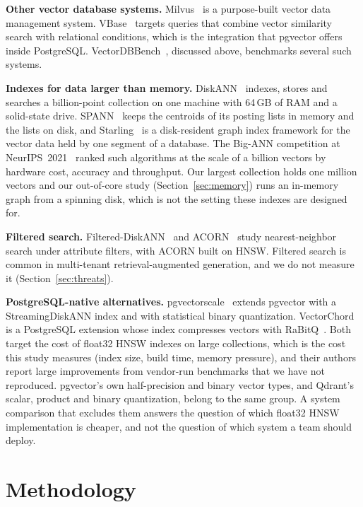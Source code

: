 \documentclass[preprint,12pt]{elsarticle}
\begin{document}
\textbf{Other vector database systems.} Milvus~\cite{milvus2021} is a purpose-built vector
data management system. VBase~\cite{vbase2023} targets queries that combine vector similarity
search with relational conditions, which is the integration that pgvector offers inside
PostgreSQL. VectorDBBench~\cite{vectordbbench}, discussed above, benchmarks several such
systems.

\textbf{Indexes for data larger than memory.} DiskANN~\cite{diskann2019} indexes, stores and
searches a billion-point collection on one machine with 64\,GB of RAM and a solid-state
drive. SPANN~\cite{spann2021} keeps the centroids of its posting lists in memory and the lists
on disk, and Starling~\cite{starling2024} is a disk-resident graph index framework for the
vector data held by one segment of a database. The Big-ANN competition at
NeurIPS~2021~\cite{bigann2022} ranked such algorithms at the scale of a billion vectors by
hardware cost, accuracy and throughput. Our largest collection holds one million vectors
and our out-of-core study (Section~\ref{sec:memory}) runs an in-memory graph from a
spinning disk, which is not the setting these indexes are designed for.

\textbf{Filtered search.} Filtered-DiskANN~\cite{filtereddiskann2023} and
ACORN~\cite{acorn2024} study nearest-neighbor search under attribute filters, with ACORN built
on HNSW. Filtered search is common in multi-tenant retrieval-augmented generation, and we do
not measure it (Section~\ref{sec:threats}).

\textbf{PostgreSQL-native alternatives.} pgvectorscale~\cite{pgvectorscale} extends pgvector
with a StreamingDiskANN index and with statistical binary quantization.
VectorChord~\cite{vectorchord} is a PostgreSQL extension whose index compresses vectors with
RaBitQ~\cite{rabitq2024}. Both target the cost of float32 HNSW indexes on large collections,
which is the cost this study measures (index size, build time, memory pressure), and their
authors report large improvements from vendor-run benchmarks that we have not reproduced.
pgvector's own half-precision and binary vector types, and Qdrant's scalar, product and
binary quantization, belong to the same group. A system comparison that excludes them
answers the question of which float32 HNSW implementation is cheaper, and not the question
of which system a team should deploy.

\section{Methodology}
\end{document}
